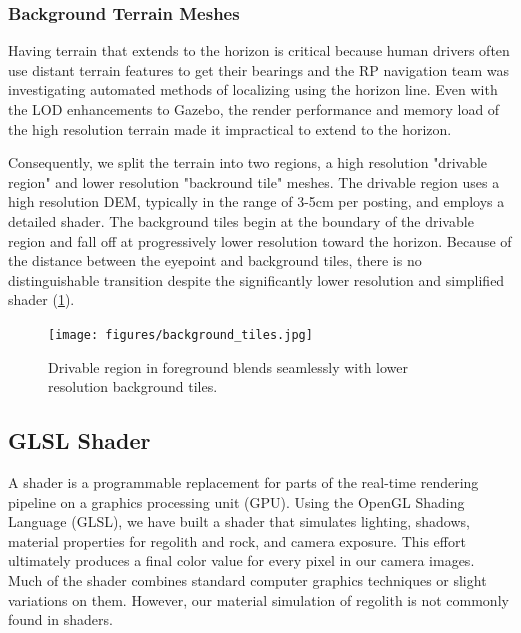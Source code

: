 \documentclass[twocolumn,letterpaper]{IEEEAerospaceCLS}  %
\begin{document}
\subsubsection{Background Terrain Meshes}

Having terrain that extends to the horizon is critical because human drivers often use distant terrain features to get their bearings and the RP navigation team was investigating automated methods of localizing using the horizon line.  Even with the LOD enhancements to Gazebo, the render performance and memory load of the high resolution terrain made it impractical to extend to the horizon.  

Consequently, we split the terrain into two regions, a high resolution "drivable region" and lower resolution "backround tile" meshes.  
The drivable region uses a high resolution DEM, typically in the range of 3-5cm per posting, and employs a detailed shader.  
The background tiles begin at the boundary of the drivable region and fall off at progressively lower resolution toward the horizon.  
Because of the distance between the eyepoint and background tiles, there is no distinguishable transition despite the significantly lower resolution and simplified shader (\cref{fig:background_tiles}).  

\begin{figure}[h!]
  \texttt{[image: figures/background\_tiles.jpg]}
  \caption{Drivable region in foreground blends seamlessly with lower resolution background tiles.}
  \label{fig:background_tiles}
\end{figure}

\subsection{GLSL Shader}

A shader is a programmable replacement for parts of the real-time rendering pipeline on a graphics processing unit (GPU).  
Using the OpenGL Shading Language (GLSL), we have built a shader that simulates lighting, shadows, material properties for regolith and rock, and camera exposure.  
This effort ultimately produces a final color value for every pixel in our camera images.  
Much of the shader combines standard computer graphics techniques or slight variations on them.  
However, our material simulation of regolith is not commonly found in shaders.
\end{document}
